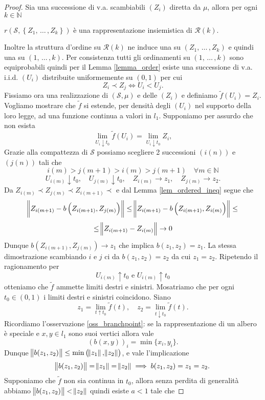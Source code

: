 \documentclass[11pt, twoside]{report}
\newcommand{\Ss}{\mathscr{S}}
\newcommand{\Rr}{\mathscr{R}}
\theoremstyle{definition}
\theoremstyle{plain}
\theoremstyle{remark}
\numberwithin{equation}{chapter}
\begin{document}
\begin{proof}
Sia una successione di v.a. scambiabili $\left(Z_i\right)$ diretta da $\mu$, allora per ogni $k\in\mathbb{N} $ 
\begin{center}
 $r\left(\Ss, \left\{Z_1, \, \dots \, ,Z_k\right\}\right)$ è una rappresentazione insiemistica di $\Rr(k)$.
\end{center}
 Inoltre la struttura d'ordine su $\Rr(k)$ ne induce una su $\left(Z_1, \,  \dots \, ,Z_k \right)$ e quindi una su $\left(1, \, \dots \, ,k\right)$. Per consistenza tutti gli ordinamenti su $(1, \, \dots \, ,k)$ sono equiprobabili quindi per il Lemma \ref{lemma_order} esiste una successione di v.a. i.i.d. $(U_i)$ distribuite uniformemente su $(0,1)$ per cui
$$ Z_i\prec Z_j \iff U_i<U_j.$$
Fissiamo ora una realizzazione di $\left(\Ss, \mu\right)$ e delle $(Z_i)$ e definiamo $\tilde{f}(U_i)=Z_i$. Vogliamo mostrare che $\tilde{f}$ si estende, per densità degli $(U_i)$ nel supporto della loro legge, ad una funzione continua a valori in $l_1$.
Supponiamo per assurdo che non esista
$$ \lim\limits_{U_i \downarrow t_0} \tilde{f}(U_i)=\lim\limits_{U_i \downarrow t_0} Z_i,$$
Grazie alla compattezza di $\Ss$ possiamo scegliere 2 successioni $\left(i(n)\right)$ e $\left(j(n)\right)$ tali che
$$ i(m)>j(m+1)>i(m)>j(m+1)\quad \forall m\in\mathbb{N} $$
$$ U_{i(m)} \downarrow t_0, \quad  U_{j(m)} \downarrow t_0, \quad Z_{i(m)}\rightarrow z_1, \quad Z_{j(m)}\rightarrow z_2.$$
Da $Z_{i(m)}\prec Z_{j(m)}\prec Z_{i(m+1)}\prec$ e dal Lemma \ref{lem_ordered_ineq} segue che 
$$\norm{Z_{i(m+1)}-b\left(Z_{i(m+1)}, Z_{j(m)}\right)}\leq \norm{Z_{i(m+1)}-b\left(Z_{i(m+1)}, Z_{i(m)}\right)}\leq$$
$$\leq \norm{Z_{i(m+1)} - Z_{i(m)}}\rightarrow 0$$
Dunque $b\left(Z_{i(m+1)}, Z_{j(m)}\right)\rightarrow z_1$ che implica $b(z_1,z_2)=z_1$. La stessa dimostrazione scambiando $i$ e $j$ ci da $b(z_1,z_2)=z_2$ da cui $z_1=z_2$. Ripetendo il ragionamento per 
$$U_{i(m)}\uparrow t_0 \text{ e } U_{i(m)}\uparrow t_0$$
otteniamo che $\tilde{f}$ ammette limiti destri e sinistri.
Mosatriamo che per ogni $t_0\in (0,1)$ i limiti destri e sinistri coincidono. Siano
$$z_1=\lim\limits_{t\uparrow t_0} \tilde{f}(t), \quad z_2=\lim\limits_{t\downarrow t_0} \tilde{f}(t).$$
Ricordiamo l'osservazione \ref{oss_branchpoint}: se la rappresentazione di un albero è speciale e $x,y\in l_1$ sono suoi vertici allora vale 
$$(b(x,y))_i=\min\{x_i, y_i\}.$$
Dunque $\norm{b(z_1,z_2)}\leq \min\left(\norm{z_1}, \norm{z_2}\right)$, e vale l'implicazione
$$\norm{b(z_1,z_2)}=\norm{z_1}=\norm{z_2} \implies b(z_1,z_2)=z_1=z_2.$$
Supponiamo che $\tilde{f}$ non sia continua in $t_0$, allora senza perdita di generalità abbiamo $\norm{b(z_1,z_2)}<\norm{z_2}$ quindi esiste $a<1$ tale che

\end{proof}
\end{document}
